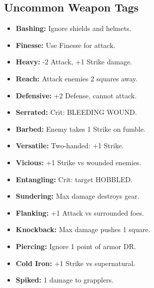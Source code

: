 \documentclass[10pt,twoside]{article}
\begin{document}
\subsection{Uncommon Weapon Tags}
\begin{minipage}[t]{0.48\textwidth}
\begin{itemize}[leftmargin=0.3cm, itemsep=0.1cm]
\item \textcolor{uncommoncolor}{\textbf{Bashing:}} \textcolor{uncommoncolor}{Ignore shields and helmets.}
\item \textcolor{uncommoncolor}{\textbf{Finesse:}} \textcolor{uncommoncolor}{Use Finesse for attack.}
\item \textcolor{uncommoncolor}{\textbf{Heavy:}} \textcolor{uncommoncolor}{-2 Attack, +1 Strike damage.}
\item \textcolor{uncommoncolor}{\textbf{Reach:}} \textcolor{uncommoncolor}{Attack enemies 2 squares away.}
\item \textcolor{uncommoncolor}{\textbf{Defensive:}} \textcolor{uncommoncolor}{+2 Defense, cannot attack.}
\item \textcolor{uncommoncolor}{\textbf{Serrated:}} \textcolor{uncommoncolor}{Crit: BLEEDING WOUND.}
\item \textcolor{uncommoncolor}{\textbf{Barbed:}} \textcolor{uncommoncolor}{Enemy takes 1 Strike on fumble.}
\item \textcolor{uncommoncolor}{\textbf{Versatile:}} \textcolor{uncommoncolor}{Two-handed: +1 Strike.}
\item \textcolor{uncommoncolor}{\textbf{Vicious:}} \textcolor{uncommoncolor}{+1 Strike vs wounded enemies.}
\item \textcolor{uncommoncolor}{\textbf{Entangling:}} \textcolor{uncommoncolor}{Crit: target HOBBLED.}
\item \textcolor{uncommoncolor}{\textbf{Sundering:}} \textcolor{uncommoncolor}{Max damage destroys gear.}
\item \textcolor{uncommoncolor}{\textbf{Flanking:}} \textcolor{uncommoncolor}{+1 Attack vs surrounded foes.}
\item \textcolor{uncommoncolor}{\textbf{Knockback:}} \textcolor{uncommoncolor}{Max damage pushes 1 square.}
\item \textcolor{uncommoncolor}{\textbf{Piercing:}} \textcolor{uncommoncolor}{Ignore 1 point of armor DR.}
\item \textcolor{uncommoncolor}{\textbf{Cold Iron:}} \textcolor{uncommoncolor}{+1 Strike vs supernatural.}
\item \textcolor{uncommoncolor}{\textbf{Spiked:}} \textcolor{uncommoncolor}{1 damage to grapplers.}
\end{itemize}
\end{minipage}
\end{document}
